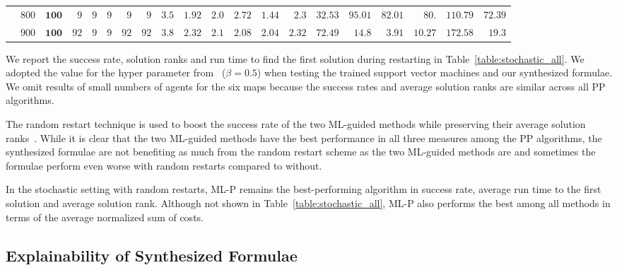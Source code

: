 \documentclass[letterpaper]{article} %
\begin{document}
\begin{table*}[t!]
\begin{tabular}{c|c|rrrrrr|rrrrrr|rrrrrr}
& $800$ & $\mathbf{100}$ & $9$ & $9$ & $9$ & $9$ & $9$ & $3.5$ & $1.92$ & $2.0$ & $2.72$ & $\mathbf{1.44}$ & $2.3$ & $\mathbf{32.53}$ & $95.01$ & $82.01$ & $80.$ & $110.79$ & $72.39$ \\
& $900$ & $\mathbf{100}$ & $92$ & $9$ & $9$ & $92$ & $92$ & $3.8$ & $2.32$ & $2.1$ & $2.08$ & $\mathbf{2.04}$ & $2.32$ & $\mathbf{72.49}$ & $14.8$ & $3.91$ & $10.27$ & $172.58$ & $19.3$ \\
\end{tabular}
\end{table*}

We report the success rate, solution ranks and run time to find the first solution during restarting in Table~\ref{table:stochastic_all}. We adopted the value for the hyper parameter from~\citet{zhang2022learning} ($ \beta = 0.5 $) when testing the trained support vector machines and our synthesized formulae. We omit results of small numbers of agents for the six maps because the success rates and average solution ranks are similar across all PP algorithms.

The random restart technique is used to boost the success rate of the two ML-guided methods while preserving their average solution ranks~\citep{zhang2022learning}. While it is clear that the two ML-guided methods have the best performance in all three measures among the PP algorithms, the synthesized formulae are not benefiting as much from the random restart scheme as the two ML-guided methods are and sometimes the formulae perform even worse with random restarts compared to without.

In the stochastic setting with random restarts, ML-P remains the best-performing algorithm in success rate, average run time to the first solution and average solution rank. Although not shown in Table~\ref{table:stochastic_all}, ML-P also performs the best among all methods in terms of the average normalized sum of costs.

\subsection{Explainability of Synthesized Formulae}
\label{sec:explain}
\end{document}
